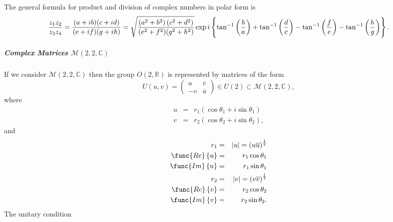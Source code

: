 \documentclass[aps,preprint]{revtex4}
\begin{document}
The general formula for product and division of complex numbers in polar
form is%
\begin{equation}
\frac{z_{1}z_{2}}{z_{3}z_{4}}=\frac{(a+ib)(c+id)}{(e+if)(g+ih)}=\sqrt{\frac{%
\left( a^{2}+b^{2}\right) (c^{2}+d^{2})}{(e^{2}+f^{2})(g^{2}+h^{2})}}\exp
i\left\{ \overset{}{\tan ^{-1}\left( \frac{b}{a}\right) +\tan ^{-1}\left( 
\frac{d}{c}\right) -\tan ^{-1}\left( \frac{f}{e}\right) -\tan ^{-1}\left( 
\frac{h}{g}\right) }\right\} .
\end{equation}

\subparagraph{Complex Matrices $\mathcal{M}\left( 2,2,\mathbb{C}\right) $}

If we consider $\mathcal{M}\left( 2,2,\mathbb{C}\right) $ then the group $%
O\left( 2,\mathbb{R}\right) $ is represented by matrices of the form%
\begin{equation}
U\left( u,v\right) =\left( 
\begin{array}{cc}
u & \overline{v} \\ 
-v & \overline{u}%
\end{array}%
\right) \in U\left( 2\right) \subset \mathcal{M}\left( 2,2,\mathbb{C}\right)
,
\end{equation}%
where%
\begin{eqnarray}
u &=&r_{1}\left( \cos \theta _{1}+i\sin \theta _{1}\right) \\
v &=&r_{2}\left( \cos \theta _{2}+i\sin \theta _{2}\right) ,
\end{eqnarray}%
and%
\begin{eqnarray}
r_{1} &=&\left\vert u\right\vert =\left( u\overline{u}\right) ^{\frac{1}{2}}
\\
\func{Re}\left\{ u\right\} &=&r_{1}\cos \theta _{1} \\
\func{Im}\left\{ u\right\} &=&r_{1}\sin \theta _{1} \\
r_{2} &=&\left\vert v\right\vert =\left( v\overline{v}\right) ^{\frac{1}{2}}
\\
\func{Re}\left\{ v\right\} &=&r_{2}\cos \theta _{2} \\
\func{Im}\left\{ v\right\} &=&r_{2}\sin \theta _{2}.
\end{eqnarray}%
The unitary condition 
\end{document}
